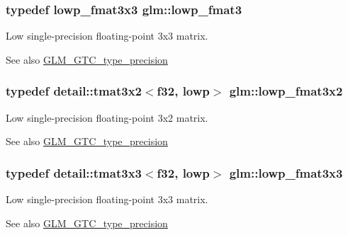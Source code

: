 \subsubsection[{\texorpdfstring{lowp\+\_\+fmat3}{lowp_fmat3}}]{\setlength{\rightskip}{0pt plus 5cm}typedef lowp\+\_\+fmat3x3 {\bf glm\+::lowp\+\_\+fmat3}}\hypertarget{group__gtc__type__precision_ga88ae00cab6aae48d56700915c7799973}{}\label{group__gtc__type__precision_ga88ae00cab6aae48d56700915c7799973}
Low single-\/precision floating-\/point 3x3 matrix. \begin{DoxySeeAlso}{See also}
\hyperlink{group__gtc__type__precision}{G\+L\+M\+\_\+\+G\+T\+C\+\_\+type\+\_\+precision} 
\end{DoxySeeAlso}
\subsubsection[{\texorpdfstring{lowp\+\_\+fmat3x2}{lowp_fmat3x2}}]{\setlength{\rightskip}{0pt plus 5cm}typedef detail\+::tmat3x2$<$f32, lowp$>$ {\bf glm\+::lowp\+\_\+fmat3x2}}\hypertarget{group__gtc__type__precision_ga6e03c9a11f7d781af7549ce566844cc6}{}\label{group__gtc__type__precision_ga6e03c9a11f7d781af7549ce566844cc6}
Low single-\/precision floating-\/point 3x2 matrix. \begin{DoxySeeAlso}{See also}
\hyperlink{group__gtc__type__precision}{G\+L\+M\+\_\+\+G\+T\+C\+\_\+type\+\_\+precision} 
\end{DoxySeeAlso}
\subsubsection[{\texorpdfstring{lowp\+\_\+fmat3x3}{lowp_fmat3x3}}]{\setlength{\rightskip}{0pt plus 5cm}typedef detail\+::tmat3x3$<$f32, lowp$>$ {\bf glm\+::lowp\+\_\+fmat3x3}}\hypertarget{group__gtc__type__precision_ga25b389b52269f3256f015b4fff5789c2}{}\label{group__gtc__type__precision_ga25b389b52269f3256f015b4fff5789c2}
Low single-\/precision floating-\/point 3x3 matrix. \begin{DoxySeeAlso}{See also}
\hyperlink{group__gtc__type__precision}{G\+L\+M\+\_\+\+G\+T\+C\+\_\+type\+\_\+precision} 
\end{DoxySeeAlso}
